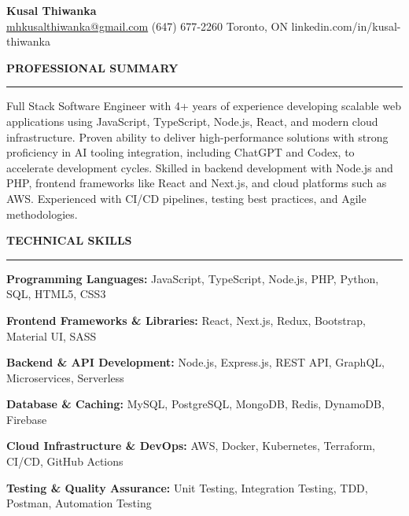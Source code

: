 \documentclass[10pt,letterpaper]{article}
\begin{document}
\begin{center}
{\LARGE\textbf{Kusal Thiwanka}}\\[3pt]
\href{mailto:mhkusalthiwanka@gmail.com}{mhkusalthiwanka@gmail.com}\hspace{2em}%
(647) 677{-}2260\hspace{2em}%
Toronto, ON\hspace{2em}
linkedin.com/in/kusal-thiwanka
\end{center}

\vspace{6pt}

\textbf{PROFESSIONAL SUMMARY}\\[-8pt]
\noindent\rule{\textwidth}{1pt}

\vspace{-2pt}

Full Stack Software Engineer with 4+ years of experience developing scalable web applications using JavaScript, TypeScript, Node.js, React, and modern cloud infrastructure. Proven ability to deliver high-performance solutions with strong proficiency in AI tooling integration, including ChatGPT and Codex, to accelerate development cycles. Skilled in backend development with Node.js and PHP, frontend frameworks like React and Next.js, and cloud platforms such as AWS. Experienced with CI/CD pipelines, testing best practices, and Agile methodologies.

\vspace{8pt}

\textbf{TECHNICAL SKILLS}\\[-8pt]
\noindent\rule{\textwidth}{1pt}

\vspace{-2pt}

\textbf{Programming Languages:} JavaScript, TypeScript, Node.js, PHP, Python, SQL, HTML5, CSS3

\textbf{Frontend Frameworks \& Libraries:} React, Next.js, Redux, Bootstrap, Material UI, SASS

\textbf{Backend \& API Development:} Node.js, Express.js, REST API, GraphQL, Microservices, Serverless

\textbf{Database \& Caching:} MySQL, PostgreSQL, MongoDB, Redis, DynamoDB, Firebase

\textbf{Cloud Infrastructure \& DevOps:} AWS, Docker, Kubernetes, Terraform, CI/CD, GitHub Actions

\textbf{Testing \& Quality Assurance:} Unit Testing, Integration Testing, TDD, Postman, Automation Testing
\end{document}
